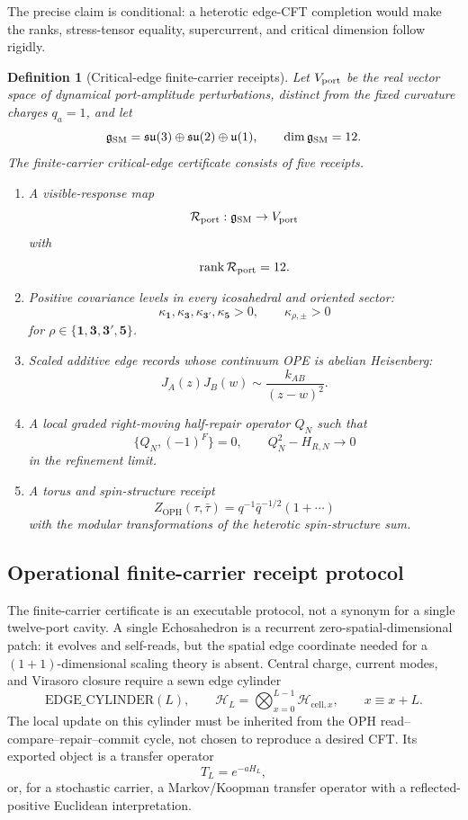 \documentclass[11pt]{article}
\newtheorem{definition}[theorem]{Definition}
\theoremstyle{remark}
\theoremstyle{plain}
\newcommand{\OPH}{\mathrm{OPH}}
\newcommand{\calR}{\mathcal R}
\begin{document}
The precise claim is conditional: a heterotic edge-CFT completion would make the ranks,
stress-tensor equality, supercurrent, and critical dimension follow rigidly.

\begin{definition}[Critical-edge finite-carrier receipts]
Let \(V_{\rm port}\) be the real vector space of dynamical port-amplitude perturbations, distinct
from the fixed curvature charges \(q_a=1\), and let
\[
\mathfrak g_{\rm SM}=
\mathfrak{su}(3)\oplus\mathfrak{su}(2)\oplus\mathfrak u(1),
\qquad
\dim\mathfrak g_{\rm SM}=12.
\]
The finite-carrier critical-edge certificate consists of five receipts.
\begin{enumerate}[leftmargin=2em]
\item A visible-response map
\[
\calR_{\rm port}:\mathfrak g_{\rm SM}\to V_{\rm port}
\]
with
\[
\operatorname{rank}\calR_{\rm port}=12.
\]
\item Positive covariance levels in every icosahedral and oriented sector:
\[
\kappa_{\mathbf1},\kappa_{\mathbf3},\kappa_{\mathbf3'},\kappa_{\mathbf5}>0,
\qquad
\kappa_{\rho,\pm}>0
\]
for \(\rho\in\{\mathbf1,\mathbf3,\mathbf3',\mathbf5\}\).
\item Scaled additive edge records whose continuum OPE is abelian Heisenberg:
\[
J_A(z)J_B(w)\sim\frac{k_{AB}}{(z-w)^2}.
\]
\item A local graded right-moving half-repair operator \(Q_N\) such that
\[
\{Q_N,(-1)^F\}=0,
\qquad
Q_N^2-H_{R,N}\to0
\]
in the refinement limit.
\item A torus and spin-structure receipt
\[
Z_{\OPH}(\tau,\bar\tau)=q^{-1}\bar q^{-1/2}(1+\cdots)
\]
with the modular transformations of the heterotic spin-structure sum.
\end{enumerate}
\end{definition}

\subsection{Operational finite-carrier receipt protocol}

The finite-carrier certificate is an executable protocol, not a synonym for a single
twelve-port cavity. A single Echosahedron is a recurrent zero-spatial-dimensional patch: it evolves
and self-reads, but the spatial edge coordinate needed for a
\((1+1)\)-dimensional scaling theory is absent. Central charge, current modes, and Virasoro closure
require a sewn edge cylinder
\[
\mathrm{EDGE\_CYLINDER}(L),
\qquad
\mathcal H_L=\bigotimes_{x=0}^{L-1}\mathcal H_{\mathrm{cell},x},
\qquad x\equiv x+L.
\]
The local update on this cylinder must be inherited from the OPH read--compare--repair--commit
cycle, not chosen to reproduce a desired CFT. Its exported object is a transfer operator
\[
T_L=e^{-aH_L},
\]
or, for a stochastic carrier, a Markov/Koopman transfer operator with a reflected-positive
Euclidean interpretation.
\end{document}
